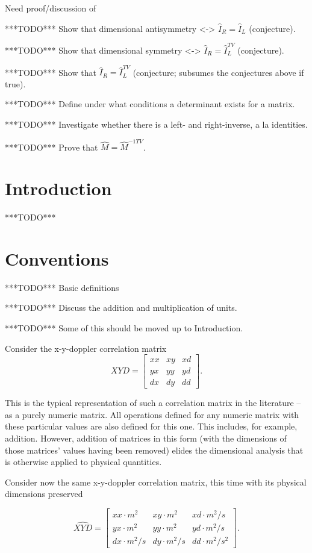 \documentclass[10pt,letterpaper]{article}
\author{T. Zachary Laine}
\numberwithin{equation}{section}
\begin{document}
Need proof/discussion of

***TODO*** Show that dimensional antisymmetry <-> $\hat I_R = \hat I_L$ (conjecture).

***TODO*** Show that dimensional symmetry <-> $\hat I_R = \hat I_L^{TV}$ (conjecture).

***TODO*** Show that $\hat I_R = \hat I_L^{TV}$ (conjecture; subsumes the
conjectures above if true).

***TODO*** Define under what conditions a determinant exists for a matrix.

***TODO*** Investigate whether there is a left- and right-inverse, a la identities.

***TODO*** Prove that $\hat M = \hat M^{-1TV}$.

\section{Introduction}

***TODO***

\section{Conventions}

***TODO*** Basic definitions

***TODO*** Discuss the addition and multiplication of units.

***TODO*** Some of this should be moved up to Introduction.

Consider the x-y-doppler correlation matrix
\[XYD = \left[ \begin{matrix}
xx & xy & xd \\ yx & yy & yd \\ dx & dy & dd
\end{matrix} \right]. \]

This is the typical representation of such a correlation matrix in the
literature – as a purely numeric matrix.  All operations defined for
any numeric matrix with these particular values are also defined for
this one.  This includes, for example, addition.  However, addition of
matrices in this form (with the dimensions of those matrices' values
having been removed) elides the dimensional analysis that is otherwise
applied to physical quantities.

Consider now the same x-y-doppler correlation matrix, this time with
its physical dimensions preserved

\[ \widehat{XYD}= \left[ \begin{matrix}
  xx \cdot m^2 & xy \cdot m^2 & xd \cdot m^2/s \\
  yx \cdot m^2 & yy \cdot m^2 & yd \cdot m^2/s \\
  dx \cdot m^2/s & dy \cdot m^2/s & dd \cdot m^2/s^2
\end{matrix} \right]. \]
\end{document}
